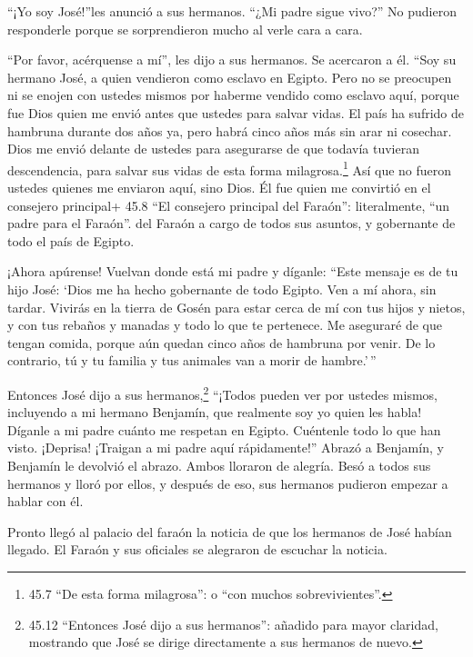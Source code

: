  ``¡Yo soy José!''les anunció a sus hermanos. ``¿Mi padre
sigue vivo?'' No pudieron responderle porque se sorprendieron mucho al
verle cara a cara.

 ``Por favor, acérquense a mí'', les dijo a sus hermanos. Se
acercaron a él. ``Soy su hermano José, a quien vendieron como esclavo en
Egipto.  Pero no se preocupen ni se enojen con ustedes
mismos por haberme vendido como esclavo aquí, porque fue Dios quien me
envió antes que ustedes para salvar vidas.  El país ha
sufrido de hambruna durante dos años ya, pero habrá cinco años más sin
arar ni cosechar.  Dios me envió delante de ustedes para
asegurarse de que todavía tuvieran descendencia, para salvar sus vidas
de esta forma milagrosa.\footnote{45.7 ``De esta forma milagrosa'': o
  ``con muchos sobrevivientes''.}  Así que no fueron ustedes
quienes me enviaron aquí, sino Dios. Él fue quien me convirtió en el
consejero principal+ 45.8 ``El consejero principal del Faraón'':
literalmente, ``un padre para el Faraón''. del Faraón a cargo de todos
sus asuntos, y gobernante de todo el país de Egipto.

 ¡Ahora apúrense! Vuelvan donde está mi padre y díganle:
``Este mensaje es de tu hijo José: `Dios me ha hecho gobernante de todo
Egipto. Ven a mí ahora, sin tardar.  Vivirás en la tierra
de Gosén para estar cerca de mí con tus hijos y nietos, y con tus
rebaños y manadas y todo lo que te pertenece.  Me aseguraré
de que tengan comida, porque aún quedan cinco años de hambruna por
venir. De lo contrario, tú y tu familia y tus animales van a morir de
hambre.'\,''

 Entonces José dijo a sus hermanos,\footnote{45.12
  ``Entonces José dijo a sus hermanos'': añadido para mayor claridad,
  mostrando que José se dirige directamente a sus hermanos de nuevo.}
``¡Todos pueden ver por ustedes mismos, incluyendo a mi hermano
Benjamín, que realmente soy yo quien les habla!  Díganle a
mi padre cuánto me respetan en Egipto. Cuéntenle todo lo que han visto.
¡Deprisa! ¡Traigan a mi padre aquí rápidamente!''  Abrazó a
Benjamín, y Benjamín le devolvió el abrazo. Ambos lloraron de alegría.
 Besó a todos sus hermanos y lloró por ellos, y después de
eso, sus hermanos pudieron empezar a hablar con él.

 Pronto llegó al palacio del faraón la noticia de que los
hermanos de José habían llegado. El Faraón y sus oficiales se alegraron
de escuchar la noticia.

